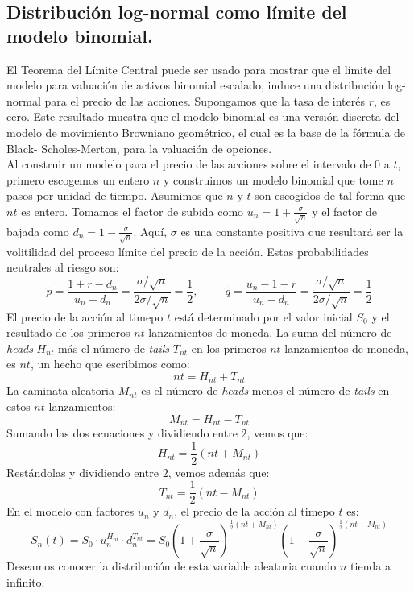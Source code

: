 \documentclass[11pt,notitlepage]{article}
\begin{document}
\subsection{Distribución log-normal como límite del modelo binomial.}
El Teorema del Límite Central puede ser usado para mostrar que el límite del modelo para valuación de activos binomial escalado, induce una distribución log-normal para el precio de las acciones. Supongamos que la tasa de interés $r$, es cero. Este resultado muestra que el modelo binomial es una versión discreta del modelo de movimiento Browniano geométrico, el cual es la base de la fórmula de Black- Scholes-Merton, para la valuación de opciones.\\
Al construir un modelo para el precio de las acciones sobre el intervalo de $0$ a $t$, primero escogemos un entero $n$ y construimos un modelo binomial que tome $n$ pasos por unidad de tiempo. Asumimos que $n$ y $t$ son escogidos de tal forma que $nt$ es entero. Tomamos el factor de subida como $u_n = 1 + \frac{\sigma}{\sqrt{n}}$ y el factor de bajada como  $d_n = 1 - \frac{\sigma}{\sqrt{n}}$. Aquí, $\sigma$ es una constante positiva que resultará ser la volitilidad del proceso límite del precio de la acción. Estas probabilidades neutrales al riesgo son:
\[\tilde{p} = \frac{1+ r - d_n}{u_n - d_n} = \frac{\sigma/\sqrt{n}}{2\sigma/\sqrt{n}} = \frac{1}{2}, \hspace{1cm} \tilde{q} = \frac{u_n - 1- r}{u_n - d_n} = \frac{\sigma/\sqrt{n}}{2\sigma/\sqrt{n}} = \frac{1}{2}\]
El precio de la acción al timepo $t$ está determinado por el valor inicial $S_0$ y el resultado de los primeros $nt$ lanzamientos de moneda. La suma del número de \textit{heads} $H_{nt}$  más el número de \textit{tails} $T_{nt}$ en los primeros $nt$ lanzamientos de moneda, es $nt$, un hecho que escribimos como:
\[nt = H_{nt} + T_{nt}\]
La caminata aleatoria $M_{nt}$ es el número de \textit{heads} menos el número de \textit{tails} en estos $nt$ lanzamientos:
 \[M_{nt} = H_{nt} -T_{nt}\]
 Sumando las dos ecuaciones y dividiendo entre $2$, vemos que:
 \[H_{nt} = \frac{1}{2}(nt + M_{nt})\]
 Restándolas y dividiendo entre $2$, vemos además que:
 \[T_{nt} = \frac{1}{2}(nt - M_{nt})\]
 En el modelo con factores $u_n$ y $d_n$, el precio de la acción al timepo $t$ es:
 \begin{equation} \label{mario2}
     S_n(t) = S_0\cdot u_n^{H_{nt}}\cdot d_n^{T_{nt}} = S_0\left(1 + \frac{\sigma}{\sqrt{n}}\right)^{\frac{1}{2}(nt + M_{nt})}\left(1 - \frac{\sigma}{\sqrt{n}}\right)^{\frac{1}{2}(nt - M_{nt})}
 \end{equation}
Deseamos conocer la distribución de esta variable aleatoria cuando $n$ tienda a infinito.
\end{document}
